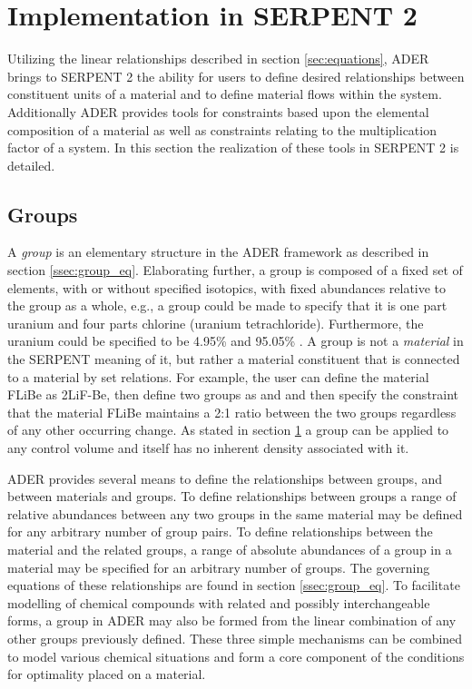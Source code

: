 \section{Implementation in SERPENT 2} \label{sec:implementation}
Utilizing the linear relationships described in 
section \ref{sec:equations}, ADER brings to SERPENT 2 the ability for
users to define desired relationships between constituent units of a material 
and to define material flows within
the system. Additionally ADER provides tools for constraints based upon the 
elemental composition of a material
as well as constraints relating to the multiplication factor of a system. 
In this section the realization of these tools in SERPENT 2 is detailed.



\subsection{Groups} \label{ssec:groups}
A \textit{group} is an elementary structure in the ADER framework as described 
in section \ref{ssec:group_eq}.
Elaborating further, a group is composed of a fixed set of elements, with or 
without specified isotopics, with fixed abundances relative to the group as a 
whole, e.g.,  a group could be made to specify that it is one part uranium and 
four parts chlorine (uranium tetrachloride). Furthermore, the uranium could be 
specified to be 4.95\%  and 95.05\% . 
A group is not a \textit{material} in the SERPENT meaning of it, but rather a 
material constituent that is connected to a material by set relations. 
For example, the user can define the material FLiBe as 2LiF-Be, 
then define two groups as  and  and then specify the 
constraint that the material FLiBe maintains a  2:1 ratio between the two 
groups regardless of any other occurring change. As stated in section 
\ref{sec:implementation} a group can be applied to any control volume and 
itself has no inherent density associated with it.

ADER provides several means to define the relationships between groups, and 
between  materials and groups. To define relationships between groups 
a range of relative abundances between any two groups in the same material
may be defined for any arbitrary number of group pairs. To define relationships
between the material and the related groups, a range of absolute abundances of 
a group in a material may be specified for an arbitrary number of groups. 
The governing equations of these relationships are found in 
section \ref{ssec:group_eq}. To facilitate modelling
of chemical compounds with related and possibly interchangeable forms, a group
in ADER may also be formed from the linear combination of any other groups
previously defined. These three simple mechanisms can be combined to model
various chemical situations and form a core component of the conditions for
optimality placed on a material. 

